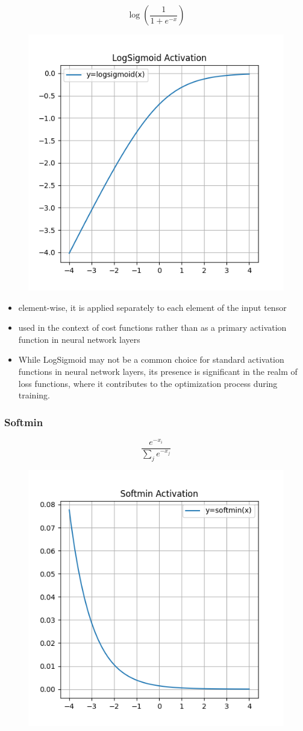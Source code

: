 \documentclass[11pt]{article}
\begin{document}
\begin{definition}\label{eq:activation-logsigmoid}
    \begin{equation*}
        \log(\frac{1}{1+e^{-x}})
    \end{equation*}
\end{definition}

\begin{figure}[H]
    \centering
    \includegraphics*[width=.4\linewidth]{figures/LogSigmoid Activation.png}\label{fig:logsigmoid}
\end{figure}

\begin{itemize}
    \item element-wise, it is applied separately to each element of the input tensor
    \item used in the context of cost functions rather than as  a primary activation function in neural network layers
    \item While LogSigmoid may not be a common choice for standard activation functions in neural network layers, its presence is significant in the realm of loss functions, where it contributes to the optimization process during training.
\end{itemize}

\subsubsection{Softmin}

\begin{definition}\label{eq:activation-softmin}
    \begin{equation*}
        \frac{e^{-x_i}}{\sum_j e^{-x_j}}
    \end{equation*}
\end{definition}

\begin{figure}[H]
    \centering
    \includegraphics*[width=.4\linewidth]{figures/Softmin Activation.png}\label{fig:softmin}
\end{figure}
\end{document}
